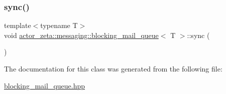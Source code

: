 \subsubsection{\texorpdfstring{sync()}{sync()}}
{\footnotesize\ttfamily template$<$typename T$>$ \\
void \hyperlink{classactor__zeta_1_1messaging_1_1blocking__mail__queue}{actor\+\_\+zeta\+::messaging\+::blocking\+\_\+mail\+\_\+queue}$<$ T $>$\+::sync (\begin{DoxyParamCaption}{ }\end{DoxyParamCaption})\hspace{0.3cm}{\ttfamily [inline]}}



The documentation for this class was generated from the following file\+:\begin{DoxyCompactItemize}
\item 
\hyperlink{blocking__mail__queue_8hpp}{blocking\+\_\+mail\+\_\+queue.\+hpp}\end{DoxyCompactItemize}

